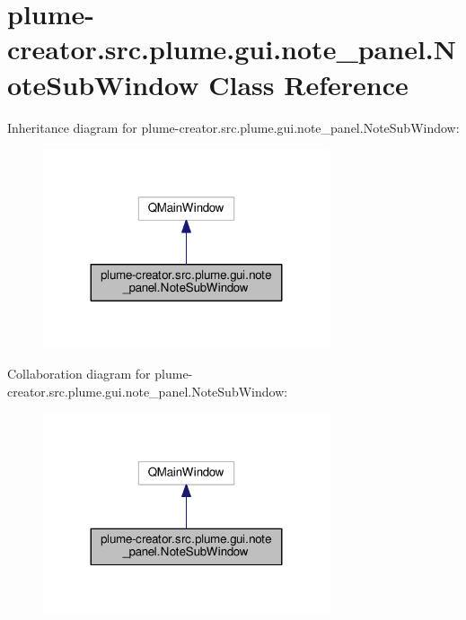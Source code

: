 \hypertarget{classplume-creator_1_1src_1_1plume_1_1gui_1_1note__panel_1_1_note_sub_window}{}\section{plume-\/creator.src.\+plume.\+gui.\+note\+\_\+panel.\+Note\+Sub\+Window Class Reference}
\label{classplume-creator_1_1src_1_1plume_1_1gui_1_1note__panel_1_1_note_sub_window}


Inheritance diagram for plume-\/creator.src.\+plume.\+gui.\+note\+\_\+panel.\+Note\+Sub\+Window\+:\nopagebreak
\begin{figure}[H]
\begin{center}
\leavevmode
\includegraphics[width=239pt]{classplume-creator_1_1src_1_1plume_1_1gui_1_1note__panel_1_1_note_sub_window__inherit__graph}
\end{center}
\end{figure}


Collaboration diagram for plume-\/creator.src.\+plume.\+gui.\+note\+\_\+panel.\+Note\+Sub\+Window\+:\nopagebreak
\begin{figure}[H]
\begin{center}
\leavevmode
\includegraphics[width=239pt]{classplume-creator_1_1src_1_1plume_1_1gui_1_1note__panel_1_1_note_sub_window__coll__graph}
\end{center}
\end{figure}
